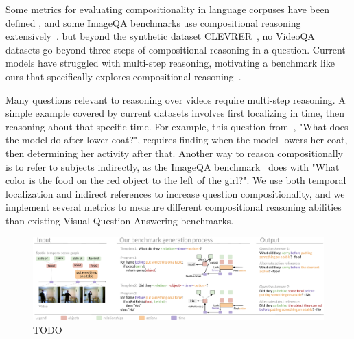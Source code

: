 Some metrics for evaluating compositionality in language corpuses have been defined \cite{keysers2019measuring,lake2018generalization}, and some ImageQA benchmarks use compositional reasoning extensively~\cite{johnson2017clevr,hudson2019gqa}. but beyond the synthetic dataset CLEVRER~\cite{yi2019clevrer}, no VideoQA datasets go beyond three steps of compositional reasoning in a question. 
Current models have struggled with multi-step reasoning, motivating a benchmark like ours that specifically explores compositional reasoning~\cite{fan2019heterogeneous}.


Many questions relevant to reasoning over videos require multi-step reasoning. A simple example covered by current datasets involves first localizing in time, then reasoning about that specific time. For example, this question from~\cite{jang2017tgif}, "What does the model do after
lower coat?", requires finding when the model lowers her coat, then determining her activity after that. Another way to reason compositionally  is to refer to subjects indirectly, as the ImageQA benchmark~\cite{hudson2019gqa} does with "What color is the food on the red object to the left of the girl?". We use both temporal localization and indirect references to increase question compositionality, and we implement several metrics to measure different compositional reasoning abilities than existing Visual Question Answering benchmarks.


\begin{figure}[t]
    \centering
    \includegraphics[width=0.95\linewidth]{figures/system.pdf}
    \caption{TODO}
    \label{fig:pull}
\end{figure}